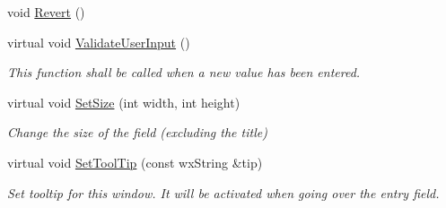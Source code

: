 \begin{DoxyCompactItemize}
\item 
void \mbox{\hyperlink{class_obj_cryst_1_1_w_x_field_name_a59ce32e9b9860b6cc6a0833f9d96b753}{Revert}} ()
\item 
\mbox{\label{class_obj_cryst_1_1_w_x_field_name_ad522a1452ad2cc92be655b1756f5b925}} 
virtual void \mbox{\hyperlink{class_obj_cryst_1_1_w_x_field_name_ad522a1452ad2cc92be655b1756f5b925}{Validate\+User\+Input}} ()
\begin{DoxyCompactList}\small\item\em This function shall be called when a new value has been entered. \end{DoxyCompactList}\item 
\mbox{\label{class_obj_cryst_1_1_w_x_field_name_a9188900f65d46ab7372efc6153ca0d5c}} 
virtual void \mbox{\hyperlink{class_obj_cryst_1_1_w_x_field_name_a9188900f65d46ab7372efc6153ca0d5c}{Set\+Size}} (int width, int height)
\begin{DoxyCompactList}\small\item\em Change the size of the field (excluding the title) \end{DoxyCompactList}\item 
\mbox{\label{class_obj_cryst_1_1_w_x_field_name_a947e6c3ff346ab46b1ef4505baf8cfd6}} 
virtual void \mbox{\hyperlink{class_obj_cryst_1_1_w_x_field_name_a947e6c3ff346ab46b1ef4505baf8cfd6}{Set\+Tool\+Tip}} (const wx\+String \&tip)
\begin{DoxyCompactList}\small\item\em Set tooltip for this window. It will be activated when going over the entry field. \end{DoxyCompactList}\end{DoxyCompactItemize}
